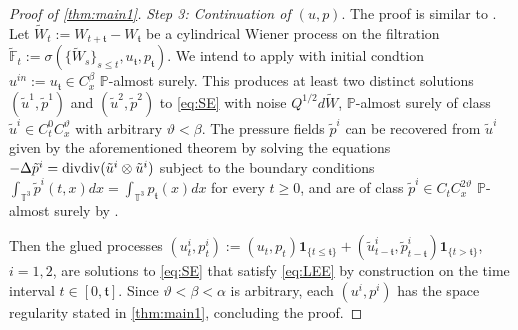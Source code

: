 \documentclass[10pt,a4paper]{amsart}
\numberwithin{equation}{section}
\numberwithin{corollario}{section}
\numberwithin{lemma}{section}
\numberwithin{prop}{section}
\theoremstyle{definition}
\theoremstyle{remark}
\newcommand{\T}{\mathbb{T}}
\newcommand{\dvg}{\mathord{{\rm div}}}
\begin{document}
\begin{proof}[Proof of \autoref{thm:main1}]
\textit{Step 3: Continuation of $(u,p)$}.
The proof is similar to \cite[Corollary 1.8]{LuLuZh25}.
Let $\tilde{W}_t := W_{t+\mathfrak{t}}-W_\mathfrak{t}$ be a cylindrical Wiener process on the filtration $\tilde{\mathbb{F}}_t := \sigma(\{\tilde{W}_s\}_{s \leq t},u_{\mathfrak{t}},p_\mathfrak{t})$. We intend to apply \cite[Theorem 1.7]{LuLuZh25} with initial condtion $u^{in} := u_{\mathfrak{t}} \in C^\beta_x$ $\mathbb{P}$-almost surely. This produces at least two distinct solutions $(\tilde{u}^1,\tilde{p}^1)$ and $(\tilde{u}^2,\tilde{p}^2)$ to \eqref{eq:SE} with noise $Q^{1/2}d\tilde{W}$, $\mathbb{P}$-almost surely of class $\tilde{u}^i \in C^0_t C^\vartheta_x$ with arbitrary $\vartheta<\beta$.
The pressure fields $\tilde{p}^i$ can be recovered from $\tilde{u}^i$ given by the aforementioned theorem by solving the equations $-\Delta \tilde{p}^i = \dvg \dvg (\tilde{u}^i \otimes \tilde{u}^i)$ subject to the boundary conditions $\int_{\T^3}\tilde{p}^i(t,x)dx = \int_{\T^3}p_{\mathfrak{t}}(x)dx$ for every $t \geq 0$, and are of class $\tilde{p}^i \in C_tC^{2\vartheta}_x$ $\mathbb{P}$-almost surely by \cite[Corollary 3.3]{CoDR20}.

Then the glued processes $(u^i_t,p^i_t) := (u_t,p_t) \mathbf{1}_{\{t \leq \mathfrak{t}\}} + (\tilde{u}^i_{t-\mathfrak{t}},\tilde{p}^i_{t-\mathfrak{t}}) \mathbf{1}_{\{t > \mathfrak{t}\}}$, $i=1,2$, are solutions to \eqref{eq:SE} that satisfy \eqref{eq:LEE} by construction on the time interval $t \in [0,\mathfrak{t}]$.
Since $\vartheta<\beta<\alpha$ is arbitrary, each $(u^i,p^i)$ has the space regularity stated in \autoref{thm:main1}, concluding the proof.

\end{proof}
\end{document}
